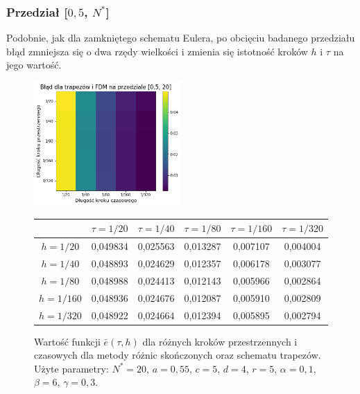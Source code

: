\documentclass{article}
\begin{document}
		\subsubsection{Przedział [$0,5$, $N^{*}$]}
		Podobnie, jak dla zamkniętego schematu Eulera, po obcięciu badanego przedziału błąd zmniejsza się o dwa rzędy wielkości i zmienia się istotność kroków $h$ i $\tau$ na jego wartość.
		\begin{figure}[h!]
			\caption{Wartość funkcji $\bar{e}(\tau,h)$ dla różnych kroków przestrzennych i czasowych dla metody różnic skończonych oraz schematu trapezów. Użyte parametry: $N^{*}=20$, $a=0,55$, $c=5$, $d=4$, $r=5$, $\alpha=0,1$, $\beta=6$, $\gamma=0,3$. }
			\centering
			\includegraphics[width=0.5\textwidth]{images/blad_fdm_trapezy_krotki.pdf}
			\begin{tabular}{|c|c|c|c|c|c|}
				\hline
				&    $\tau=1/20$ &    $\tau=1/40$ &    $\tau=1/80$ &   $\tau=1/160$ &   $\tau=1/320$ \\
				\hline 
				$h=1/20$  &  0,049834 &	0,025563 &	0,013287 &	0,007107 &	0,004004 \\
				\hline
				$h=1/40$  &  0,048893 &	0,024629 &	0,012357 &	0,006178 &	0,003077 \\
				\hline
				$h=1/80$  &  0,048988 &	0,024413 &	0,012143 &	0,005966 &	0,002864 \\
				\hline
				$h=1/160$ &  0,048936 &	0,024676 &	0,012087 &	0,005910 &	0,002809 \\
				\hline
				$h=1/320$ &  0,048922 &	0,024664 &	0,012394 &	0,005895 &	0,002794 \\
				\hline
			\end{tabular}
		\end{figure}
\end{document}
